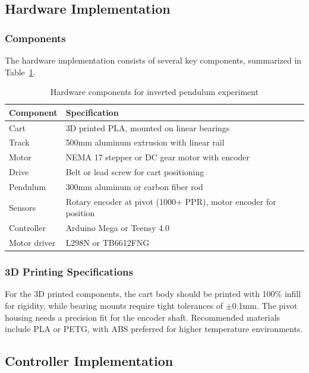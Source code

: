 \subsection{Hardware Implementation}

\subsubsection{Components}

The hardware implementation consists of several key components, summarized in Table~\ref{tab:hardware_components}.

\begin{table}[htbp]
\centering
\caption{Hardware components for inverted pendulum experiment}
\label{tab:hardware_components}
\begin{tabular}{ll}
\toprule
\textbf{Component} & \textbf{Specification} \\
\midrule
Cart & 3D printed PLA, mounted on linear bearings \\
Track & 500mm aluminum extrusion with linear rail \\
Motor & NEMA 17 stepper or DC gear motor with encoder \\
Drive & Belt or lead screw for cart positioning \\
Pendulum & 300mm aluminum or carbon fiber rod \\
Sensors & Rotary encoder at pivot (1000+ PPR), motor encoder for position \\
Controller & Arduino Mega or Teensy 4.0 \\
Motor driver & L298N or TB6612FNG \\
\bottomrule
\end{tabular}
\end{table}

\subsubsection{3D Printing Specifications}

For the 3D printed components, the cart body should be printed with 100\% infill for rigidity, while bearing mounts require tight tolerances of $\pm$0.1mm. The pivot housing needs a precision fit for the encoder shaft. Recommended materials include PLA or PETG, with ABS preferred for higher temperature environments.

\subsection{Controller Implementation}

